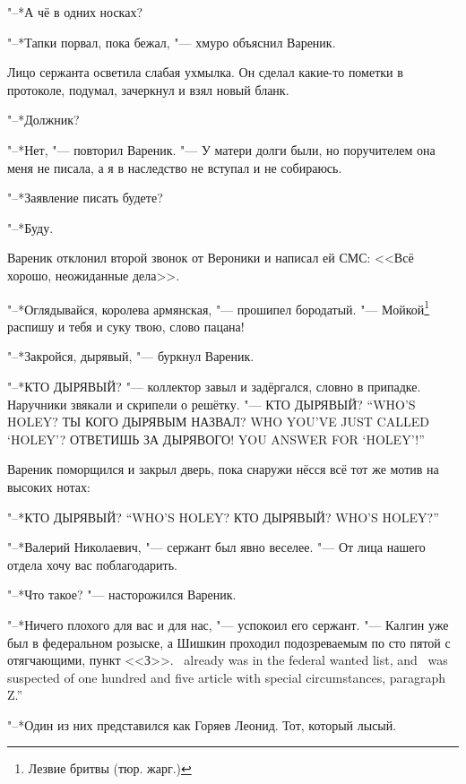 "--*А чё в одних носках?

"--*Тапки порвал, пока бежал, "--- хмуро объяснил Вареник.

Лицо сержанта осветила слабая ухмылка.
Он сделал какие-то пометки в протоколе, подумал, зачеркнул и взял новый бланк.

"--*Должник?

"--*Нет, "--- повторил Вареник.
"--- У матери долги были, но поручителем она меня не писала, а я в наследство не вступал и не собираюсь.

"--*Заявление писать будете?

"--*Буду.

\asterism

Вареник отклонил второй звонок от Вероники и написал ей СМС:
<<Всё хорошо, неожиданные дела>>.

\textspace

"--*Оглядывайся, королева армянская, "--- прошипел бородатый.
"--- Мойкой\footnote{Лезвие бритвы (тюр. жарг.)} распишу и тебя и суку твою, слово пацана!

"--*Закройся, дырявый, "--- буркнул Вареник.

"--*КТО ДЫРЯВЫЙ? "--- коллектор завыл и задёргался, словно в припадке.
Наручники звякали и скрипели о решётку.
{"--- КТО ДЫРЯВЫЙ?}
{``WHO'S HOLEY?}
{ТЫ КОГО ДЫРЯВЫМ НАЗВАЛ?}
{WHO YOU'VE JUST CALLED `HOLEY'?}
{ОТВЕТИШЬ ЗА ДЫРЯВОГО!}
{YOU ANSWER FOR `HOLEY'!''}

\textspace

Вареник поморщился и закрыл дверь, пока снаружи нёсся всё тот же мотив на высоких нотах:

{"--*КТО ДЫРЯВЫЙ?}
{``WHO'S HOLEY?}
{КТО ДЫРЯВЫЙ?}
{WHO'S HOLEY?''}

\asterism

\textspace

"--*Валерий Николаевич, "--- сержант был явно веселее.
"--- От лица нашего отдела хочу вас поблагодарить.

"--*Что такое? "--- насторожился Вареник.

"--*Ничего плохого для вас и для нас, "--- успокоил его сержант.
{"--- Калгин уже был в федеральном розыске, а Шишкин проходил подозреваемым по сто пятой с отягчающими, пункт <<З>>.}
{\Kalgin\ already was in the federal wanted list, and \Shishkin\ was suspected of one hundred and five article with special circumstances, paragraph Z.''}

"--*Один из них представился как Горяев Леонид.
Тот, который лысый.

